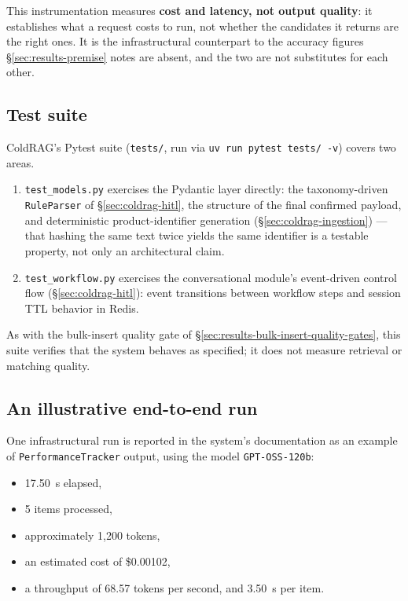 This instrumentation measures \textbf{cost and latency, not output quality}: it establishes what a request costs to run, not whether the candidates it returns are the right ones. It is the infrastructural counterpart to the accuracy figures \S\ref{sec:results-premise} notes are absent, and the two are not substitutes for each other.

\subsection{Test suite}
\label{sec:results-coldrag-tests}

ColdRAG's Pytest suite (\texttt{tests/}, run via \texttt{uv run pytest tests/ -v}) covers two areas. 
\begin{enumerate}
\item \texttt{test\_models.py} exercises the Pydantic layer directly: the taxonomy-driven \texttt{RuleParser} of \S\ref{sec:coldrag-hitl}, the structure of the final confirmed payload, and deterministic product-identifier generation (\S\ref{sec:coldrag-ingestion}) — that hashing the same text twice yields the same identifier is a testable property, not only an architectural claim. 
\item \texttt{test\_workflow.py} exercises the conversational module's event-driven control flow (\S\ref{sec:coldrag-hitl}): event transitions between workflow steps and session TTL behavior in Redis. 
\end{enumerate}


As with the bulk-insert quality gate of \S\ref{sec:results-bulk-insert-quality-gates}, this suite verifies that the system behaves as specified; it does not measure retrieval or matching quality.

\subsection{An illustrative end-to-end run}
\label{sec:results-coldrag-run}

One infrastructural run is reported in the system's documentation as an example of \texttt{PerformanceTracker} output, using the model \texttt{GPT-OSS-120b}: 
\begin{itemize}
\item 17.50~s elapsed, 
\item 5 items processed, 
\item approximately 1{,}200 tokens, 
\item an estimated cost of \$0.00102, 
\item a throughput of 68.57 tokens per second, and 3.50~s per item. 
\end{itemize}

